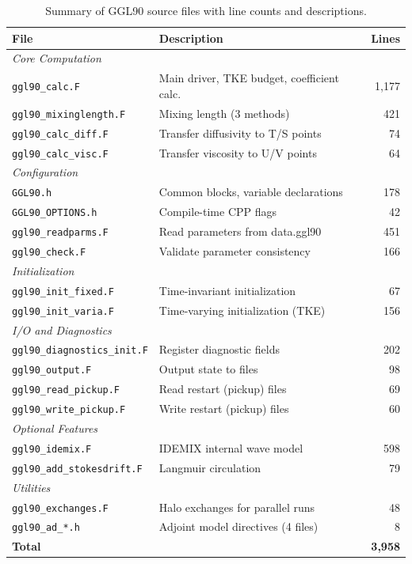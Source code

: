 \documentclass[12pt,letterpaper]{article}
\begin{document}
\begin{table}[h!]
\centering
\caption{Summary of GGL90 source files with line counts and descriptions.}
\label{tab:file_summary}
\small
\begin{tabular}{@{}llr@{}}
\toprule
\textbf{File} & \textbf{Description} & \textbf{Lines} \\
\midrule
\multicolumn{3}{l}{\textit{Core Computation}} \\
\texttt{ggl90\_calc.F} & Main driver, TKE budget, coefficient calc. & 1,177 \\
\texttt{ggl90\_mixinglength.F} & Mixing length (3 methods) & 421 \\
\texttt{ggl90\_calc\_diff.F} & Transfer diffusivity to T/S points & 74 \\
\texttt{ggl90\_calc\_visc.F} & Transfer viscosity to U/V points & 64 \\
\midrule
\multicolumn{3}{l}{\textit{Configuration}} \\
\texttt{GGL90.h} & Common blocks, variable declarations & 178 \\
\texttt{GGL90\_OPTIONS.h} & Compile-time CPP flags & 42 \\
\texttt{ggl90\_readparms.F} & Read parameters from data.ggl90 & 451 \\
\texttt{ggl90\_check.F} & Validate parameter consistency & 166 \\
\midrule
\multicolumn{3}{l}{\textit{Initialization}} \\
\texttt{ggl90\_init\_fixed.F} & Time-invariant initialization & 67 \\
\texttt{ggl90\_init\_varia.F} & Time-varying initialization (TKE) & 156 \\
\midrule
\multicolumn{3}{l}{\textit{I/O and Diagnostics}} \\
\texttt{ggl90\_diagnostics\_init.F} & Register diagnostic fields & 202 \\
\texttt{ggl90\_output.F} & Output state to files & 98 \\
\texttt{ggl90\_read\_pickup.F} & Read restart (pickup) files & 69 \\
\texttt{ggl90\_write\_pickup.F} & Write restart (pickup) files & 60 \\
\midrule
\multicolumn{3}{l}{\textit{Optional Features}} \\
\texttt{ggl90\_idemix.F} & IDEMIX internal wave model & 598 \\
\texttt{ggl90\_add\_stokesdrift.F} & Langmuir circulation & 79 \\
\midrule
\multicolumn{3}{l}{\textit{Utilities}} \\
\texttt{ggl90\_exchanges.F} & Halo exchanges for parallel runs & 48 \\
\texttt{ggl90\_ad\_*.h} & Adjoint model directives (4 files) & 8 \\
\bottomrule
\multicolumn{2}{l}{\textbf{Total}} & \textbf{3,958} \\
\end{tabular}
\end{table}
\end{document}
